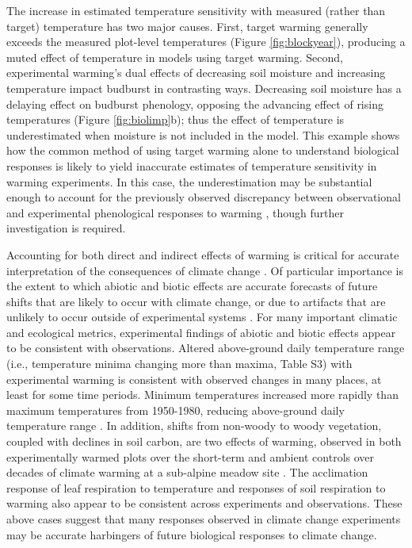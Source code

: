 \documentclass{article}
\begin{document}
\par The increase in estimated temperature sensitivity with measured (rather than target) temperature has two major causes. First, target warming generally exceeds the measured plot-level temperatures (Figure \ref{fig:blockyear}), producing a muted effect of temperature in models using target warming. Second, experimental warming's dual effects of decreasing soil moisture and increasing temperature impact budburst in contrasting ways. %
Decreasing soil moisture has a delaying effect on budburst phenology, opposing the advancing effect of rising temperatures (Figure \ref{fig:biolimp}b); thus the effect of temperature is underestimated when moisture is not included in the model. This example shows how the common method of using target warming alone to understand biological responses is likely to yield inaccurate estimates of temperature sensitivity in warming experiments. In this case, the underestimation may be substantial enough to account for the previously observed discrepancy between observational and experimental phenological responses to warming \citep{wolkovich2012}, though further investigation is required. 

\par Accounting for both direct and indirect effects of warming is critical for accurate interpretation of the consequences of climate change \citep{kharouba2015}. Of particular importance is the extent to which abiotic and biotic effects are accurate forecasts of future shifts that are likely to occur with climate change, or due to artifacts that are unlikely to occur outside of experimental systems \citep{moise2010,diamond2013}. For many important climatic and ecological metrics, experimental findings of abiotic and biotic effects appear to be consistent with observations. Altered above-ground daily temperature range (i.e., temperature minima changing more than maxima, Table S3) with experimental warming is consistent with observed changes in many places, at least for some time periods. Minimum temperatures increased more rapidly than maximum temperatures from 1950-1980, reducing above-ground daily temperature range \citep[][]{thorne2016,vose2005}. In addition, shifts from non-woody to woody vegetation, coupled with declines in soil carbon, are two effects of warming, observed in both experimentally warmed plots over the short-term and ambient controls over decades of climate warming at a sub-alpine meadow site \citep{harte2015}. The acclimation response of leaf respiration to temperature \citep{aspinwall2016,reich2016} and responses of soil respiration to warming \citep{carey2016} also appear to be consistent across experiments and observations. These above cases suggest that many responses observed in climate change experiments may be accurate harbingers of future biological responses to climate change. 
\end{document}
